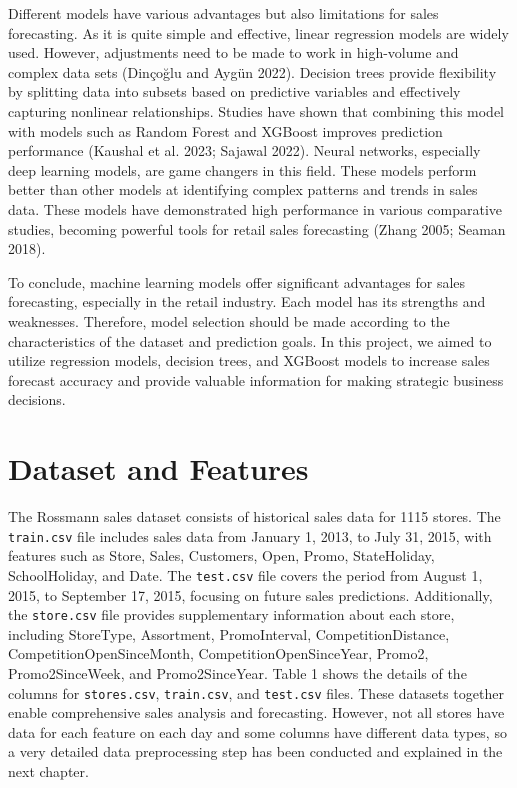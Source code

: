 \documentclass[12pt]{report}
\begin{document}
Different models have various advantages but also limitations for sales forecasting. As it is quite simple and effective, linear regression models are widely used. However, adjustments need to be made to work in high-volume and complex data sets (Dinçoğlu and Aygün 2022). Decision trees provide flexibility by splitting data into subsets based on predictive variables and effectively capturing nonlinear relationships. Studies have shown that combining this model with models such as Random Forest and XGBoost improves prediction performance (Kaushal et al. 2023; Sajawal 2022). Neural networks, especially deep learning models, are game changers in this field. These models perform better than other models at identifying complex patterns and trends in sales data. These models have demonstrated high performance in various comparative studies, becoming powerful tools for retail sales forecasting (Zhang 2005; Seaman 2018).

To conclude, machine learning models offer significant advantages for sales forecasting, especially in the retail industry. Each model has its strengths and weaknesses. Therefore, model selection should be made according to the characteristics of the dataset and prediction goals. In this project, we aimed to utilize regression models, decision trees, and XGBoost models to increase sales forecast accuracy and provide valuable information for making strategic business decisions.

\chapter{Dataset and Features}
The Rossmann sales dataset consists of historical sales data for 1115 stores. The \texttt{train.csv} file includes sales data from January 1, 2013, to July 31, 2015, with features such as Store, Sales, Customers, Open, Promo, StateHoliday, SchoolHoliday, and Date. The \texttt{test.csv} file covers the period from August 1, 2015, to September 17, 2015, focusing on future sales predictions. Additionally, the \texttt{store.csv} file provides supplementary information about each store, including StoreType, Assortment, PromoInterval, CompetitionDistance, CompetitionOpenSinceMonth, CompetitionOpenSinceYear, Promo2, Promo2SinceWeek, and Promo2SinceYear. Table 1 shows the details of the columns for \texttt{stores.csv}, \texttt{train.csv}, and \texttt{test.csv} files. These datasets together enable comprehensive sales analysis and forecasting. However, not all stores have data for each feature on each day and some columns have different data types, so a very detailed data preprocessing step has been conducted and explained in the next chapter.
\end{document}

